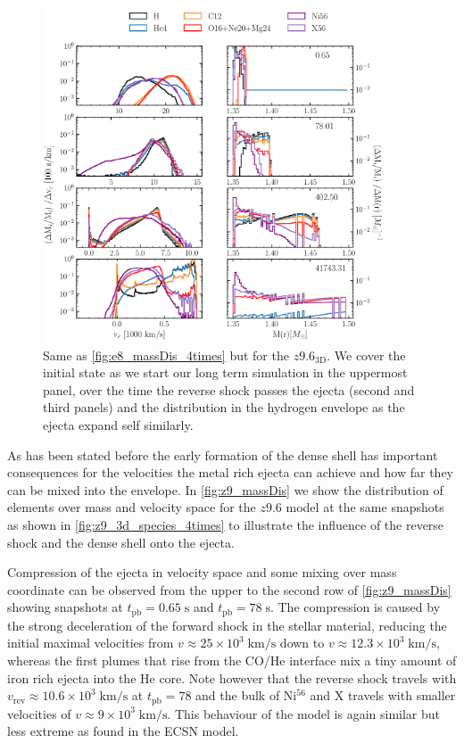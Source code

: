 \documentclass[fleqn,usenatbib]{mnras}
\newcommand{\nickel}{$\mathrm{Ni^{56}}$\xspace}
\newcommand{\tracer}{$\mathrm{X}$\xspace}
\begin{document}
\begin{figure}
 \label{fig:z9_massDis}
 \centering
 \includegraphics[width=0.9\textwidth]{pic/z93_3d_old_massDis_mvr_mas_4times.pdf}
 \caption{Same as \autoref{fig:e8_massDis_4times} but for the $z9.6_{\mathrm{3D}}$. We cover the initial state as we start our long term simulation in the uppermost panel, over the time the reverse shock passes the ejecta (second and third panels) and the distribution in the hydrogen envelope as the ejecta expand self similarly.}
\end{figure}
As has been stated before the early formation of the dense shell has important consequences for the velocities the  metal rich ejecta can achieve and how far they can be mixed into the envelope.
In \autoref{fig:z9_massDis} we show the distribution of elements over mass and velocity space for the $z9.6$ model at the same snapshots as shown in \autoref{fig:z9_3d_species_4times} to illustrate the influence of the reverse shock and the dense shell onto the ejecta.

Compression of the ejecta in velocity space and some mixing over mass coordinate can be observed from the upper to the second row of \autoref{fig:z9_massDis} showing snapshots at $t_{\mathrm{pb}}=0.65\;\mathrm{s}$ and $t_{\mathrm{pb}}=78\;\mathrm{s}$. The compression is caused by the strong deceleration of the forward shock in the stellar material, reducing the initial maximal velocities from $v\approx 25\times10^3\;\mathrm{km/s}$ down to $v\approx 12.3\times10^3\;\mathrm{km/s}$, whereas the first plumes that rise from the CO/He interface mix a tiny amount of iron rich ejecta into the He core. Note however that the reverse shock travels with $v_{\mathrm{rev}}\approx 10.6\times10^3\;\mathrm{km/s}$ at $t_{\mathrm{pb}}=78$ and the bulk of \nickel and \tracer travels with smaller velocities of $v\approx 9\times10^3\;\mathrm{km/s}$. This behaviour of the model is again similar but less extreme as found in the ECSN model.
\end{document}
